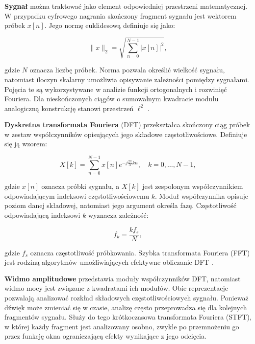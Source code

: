 \documentclass[12pt, a4paper]{article}
\theoremstyle{definition}
\theoremstyle{plain}
\theoremstyle{remark}
\begin{document}
\textbf{Sygnał} można traktować jako element odpowiedniej przestrzeni matematycznej. W przypadku cyfrowego nagrania skończony fragment sygnału jest wektorem próbek $x[n]$. Jego normę euklidesową definiuje się jako:

\begin{equation}
    \|x\|_2 =
    \sqrt{\sum_{n=0}^{N-1}|x[n]|^2},
\end{equation}

gdzie $N$ oznacza liczbę próbek. Norma pozwala określić wielkość sygnału, natomiast iloczyn skalarny umożliwia opisywanie zależności pomiędzy sygnałami. Pojęcia te są wykorzystywane w analizie funkcji ortogonalnych i rozwinięć Fouriera. Dla nieskończonych ciągów o sumowalnym kwadracie modułu analogiczną konstrukcję stanowi przestrzeń $\ell^2$ \cite{zielinski2005}.

\textbf{Dyskretna transformata Fouriera} (DFT) przekształca skończony ciąg próbek w zestaw współczynników opisujących jego składowe częstotliwościowe. Definiuje się ją wzorem:

\begin{equation}
    X[k] = \sum_{n=0}^{N-1}
    x[n]e^{-j\frac{2\pi}{N}kn},
    \quad k=0,\ldots,N-1,
\end{equation}

gdzie $x[n]$ oznacza próbki sygnału, a $X[k]$ jest zespolonym współczynnikiem odpowiadającym indeksowi częstotliwościowemu $k$. Moduł współczynnika opisuje poziom danej składowej, natomiast jego argument określa fazę. Częstotliwość odpowiadającą indeksowi $k$ wyznacza zależność:

\begin{equation}
    f_k = \frac{k f_s}{N},
\end{equation}

gdzie $f_s$ oznacza częstotliwość próbkowania. Szybka transformata Fouriera (FFT) jest rodziną algorytmów umożliwiających efektywne obliczanie DFT \cite{oppenheim2010}.

\textbf{Widmo amplitudowe} przedstawia moduły współczynników DFT, natomiast widmo mocy jest związane z kwadratami ich modułów. Obie reprezentacje pozwalają analizować rozkład składowych częstotliwościowych sygnału. Ponieważ dźwięk może zmieniać się w czasie, analizę często przeprowadza się dla kolejnych fragmentów sygnału. Służy do tego krótkoczasowa transformata Fouriera (STFT), w której każdy fragment jest analizowany osobno, zwykle po przemnożeniu go przez funkcję okna ograniczającą efekty wynikające z jego odcięcia.
\end{document}
